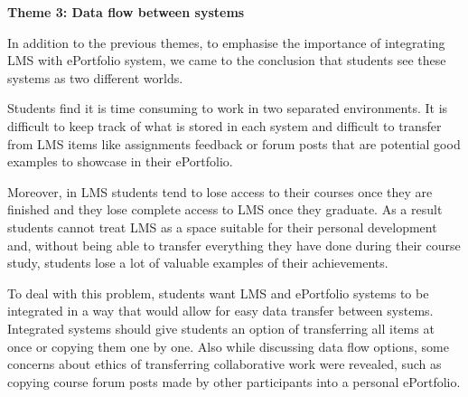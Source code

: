 \textbf{Theme 3: Data flow between systems}

In addition to the previous themes, to emphasise the importance of integrating LMS with ePortfolio
system, we came to the conclusion that students see these systems as two different worlds.


Students find it is time consuming to work in two separated environments. It is difficult to keep track of
what is stored in each system and difficult to transfer from LMS items like assignments feedback or forum posts
that are potential good examples to showcase in their ePortfolio.


Moreover, in LMS students tend to lose access to their courses once they are finished and they lose
complete access to LMS once they graduate. As a result students cannot treat LMS as a space suitable for their
personal development and, without being able to transfer everything they have done during their course study,
students lose a lot of valuable examples of their achievements.


To deal with this problem, students want LMS and ePortfolio systems to be integrated in a way that
would allow for easy data transfer between systems. Integrated systems should give students an option of
transferring all items at once or copying them one by one. Also while discussing data flow options, some
concerns about ethics of transferring collaborative work were revealed, such as copying course forum posts
made by other participants into a personal ePortfolio.


